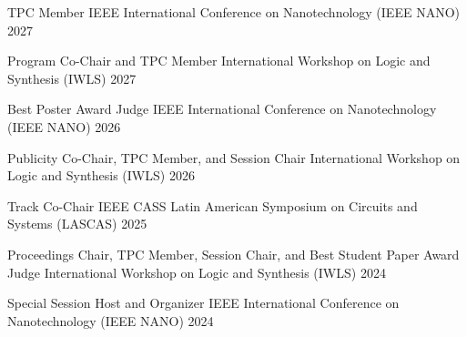 



\begin{cvhonors}

  \cvhonor
    {TPC Member} %
    {IEEE International Conference on Nanotechnology (IEEE NANO)} %
    {} %
    {2027} %

  \cvhonor
    {Program Co-Chair and TPC Member} %
    {International Workshop on Logic and Synthesis (IWLS)} %
    {} %
    {2027} %

  \cvhonor
    {Best Poster Award Judge} %
    {IEEE International Conference on Nanotechnology (IEEE NANO)} %
    {} %
    {2026} %

  \cvhonor
    {Publicity Co-Chair, TPC Member, and Session Chair} %
    {International Workshop on Logic and Synthesis (IWLS)} %
    {} %
    {2026} %

  \cvhonor
    {Track Co-Chair} %
    {IEEE CASS Latin American Symposium on Circuits and Systems (LASCAS)} %
    {} %
    {2025} %

  \cvhonor
    {Proceedings Chair, TPC Member, Session Chair, and Best Student Paper Award Judge} %
    {International Workshop on Logic and Synthesis (IWLS)} %
    {} %
    {2024} %

  \cvhonor
    {Special Session Host and Organizer} %
    {IEEE International Conference on Nanotechnology (IEEE NANO)} %
    {} %
    {2024} %


\end{cvhonors}
